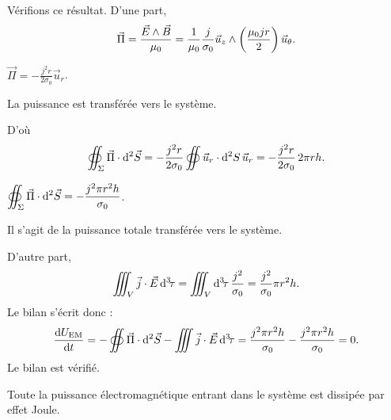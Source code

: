 \documentclass[11pt,a4paper]{article}
\newcommand{\dd}{\mathrm d}
\newcommand{\vj}{\vec j}\newcommand{\vE}{\vec E}\newcommand{\vB}{\vec B}
\newcommand{\vPi}{\vec\Pi}\newcommand{\rot}{\overrightarrow{\mathrm{rot}}}
\newcommand{\ur}{\vec u_r}\newcommand{\ut}{\vec u_\theta}\newcommand{\uphi}{\vec u_\varphi}
\newcommand{\deuxcol}[3]{\par\noindent
  \begin{minipage}[c]{#1\linewidth}\centering #2\end{minipage}\hfill
  \begin{minipage}[c]{\dimexpr\linewidth-#1\linewidth-6mm\relax}#3\end{minipage}\par}
\newcommand{\B}{\vec B}\newcommand{\A}{\vec A}
\newcommand{\dtau}{\dd^3\!\tau}\newcommand{\Ien}{I_{\text{enlacé}}}
\newcommand{\Uem}{U_{\mathrm{EM}}}\newcommand{\uem}{u_{\mathrm{EM}}}
\begin{document}
\begin{exemple}
Vérifions ce résultat. D'une part,
\[
 \vPi=\frac{\E\wedge\B}{\mu_0}
 =\frac1{\mu_0}\frac j{\sigma_0}\uz\wedge\left(\frac{\mu_0jr}{2}\right)\ut.
\]
\begin{cadre}\deuxcol{.44}{\(\displaystyle\vPi=-\frac{j^2r}{2\sigma_0}\ur\).}{La puissance est transférée vers le système.}\end{cadre}
D'où
\[
 \oiint_\Sigma\vPi\cdot\dds
 =-\frac{j^2r}{2\sigma_0}\oiint\ur\cdot\dd^2S\,\ur
 =-\frac{j^2r}{2\sigma_0}\,2\pi rh.
\]
\begin{cadre}\deuxcol{.46}{\(\displaystyle\oiint_\Sigma\vPi\cdot\dds=-\frac{j^2\pi r^2h}{\sigma_0}\).}{Il s'agit de la puissance totale transférée vers le système.}\end{cadre}
D'autre part,
\[
 \iiint_V\vj\cdot\E\,\dtau=\iiint_V\dtau\,\frac{j^2}{\sigma_0}
 =\frac{j^2}{\sigma_0}\pi r^2h.
\]
Le bilan s'écrit donc :
\[
 \frac{\dd\Uem}{\dd t}
 =-\oiint\vPi\cdot\dds-\iiint\vj\cdot\E\,\dtau
 =\frac{j^2\pi r^2h}{\sigma_0}-\frac{j^2\pi r^2h}{\sigma_0}=0.
\]
Le bilan est vérifié.
\begin{cadre}Toute la puissance électromagnétique entrant dans le système est dissipée par effet Joule.\end{cadre}
\end{exemple}
\end{document}
